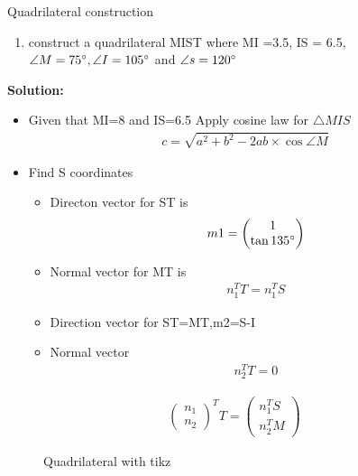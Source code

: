 \begin{frame}{Quadrilateral construction}
\begin{enumerate}
\conti
\item construct a quadrilateral MIST where MI =3.5, IS = 6.5, $\angle{M}= 75\degree,\angle{I}=105\degree$ and $\angle{s}=120\degree$
\seti
\end{enumerate}
\textbf{Solution:}
\begin{itemize}
\item Given that MI=8 and IS=6.5 Apply cosine law for $\triangle{MIS}$
\begin{align*}
c=\sqrt{a^{2}+b^{2}-2ab \times \cos\angle{M}}
\end{align*}
\item Find S coordinates
\begin{itemize}
\item Directon vector for ST is $$m1=\begin{pmatrix}
1 \\ \tan{135\degree}
\end{pmatrix}$$
\item Normal vector for MT is
\begin{align}
n_1^T T=n_1^T S
\end{align}
\item Direction vector for ST=MT,m2=S-I
\item Normal vector 
\begin{align}
n_2^T{T}=0
\end{align}


\end{itemize}
\end{itemize}
\end{frame}
\begin{frame}
\begin{align}
\begin{pmatrix} n_1 \\ n_2 \end{pmatrix}^T T=\begin{pmatrix}
n_1^T S \\ n_2^T M
\end{pmatrix}
\end{align}
\begin{figure}[!h]
\resizebox{0.4\linewidth}{!}
{

}
\caption{Quadrilateral with tikz}
\label{fig:foo}
\end{figure}
\end{frame}
